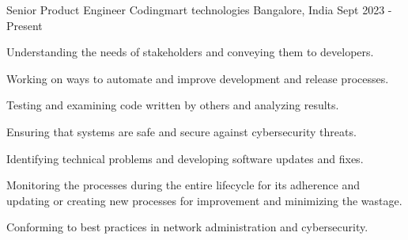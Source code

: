 

\begin{cventries}

\cventry
{Senior Product Engineer} %
{Codingmart technologies} %
{Bangalore, India} %
{Sept 2023 - Present} %
{
  \begin{cvitems} %
    \item {Understanding the needs of stakeholders and conveying them to developers.}
    \item {Working on ways to automate and improve development and release processes.}
    \item {Testing and examining code written by others and analyzing results.}
    \item {Ensuring that systems are safe and secure against cybersecurity threats.}
    \item {Identifying technical problems and developing software updates and fixes.}
    \item {Monitoring the processes during the entire lifecycle for its adherence and updating or creating new processes for improvement and minimizing the wastage.}
    \item {Conforming to best practices in network administration and cybersecurity.}
  \end{cvitems}
}



\end{cventries}
